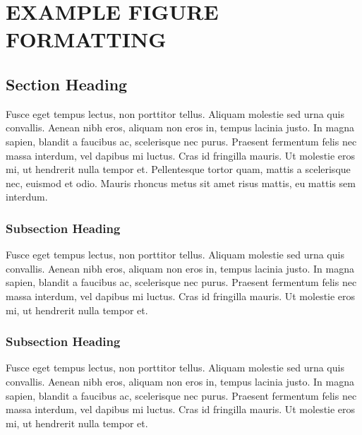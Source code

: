 \chapter{EXAMPLE FIGURE FORMATTING} \label{materials}

\renewcommand*{\thealgorithm}{\thechapter-\arabic{algorithm}} %


\section{Section Heading}

 Fusce eget tempus lectus, non porttitor tellus. Aliquam molestie sed urna quis convallis. Aenean nibh eros, aliquam non eros in, tempus lacinia justo. \cite{2008arXiv0807.1715B} In magna sapien, blandit a faucibus ac, scelerisque nec purus. Praesent fermentum felis nec massa interdum, vel dapibus mi luctus. Cras id fringilla mauris. Ut molestie eros mi, ut hendrerit nulla tempor et. Pellentesque tortor quam, mattis a scelerisque nec, euismod et odio. Mauris rhoncus metus sit amet risus mattis, eu mattis sem interdum.

\subsection{Subsection Heading}
Fusce eget tempus lectus, non porttitor tellus. Aliquam molestie sed urna quis convallis. Aenean nibh eros, aliquam non eros in, tempus lacinia justo. In magna sapien, blandit a faucibus ac, scelerisque nec purus. Praesent fermentum felis nec massa interdum, vel dapibus mi luctus. Cras id fringilla mauris. Ut molestie eros mi, ut hendrerit nulla tempor et. \cite{Rudin-UnitBallCN}

\subsection{Subsection Heading}
Fusce eget tempus lectus, non porttitor tellus. Aliquam molestie sed urna quis convallis. Aenean nibh eros, aliquam non eros in, tempus lacinia justo. In magna sapien, blandit a faucibus ac, scelerisque nec purus. Praesent fermentum felis nec massa interdum, vel dapibus mi luctus. Cras id fringilla mauris. Ut molestie eros mi, ut hendrerit nulla tempor et. \cite{Rudin-UnitBallCN}



